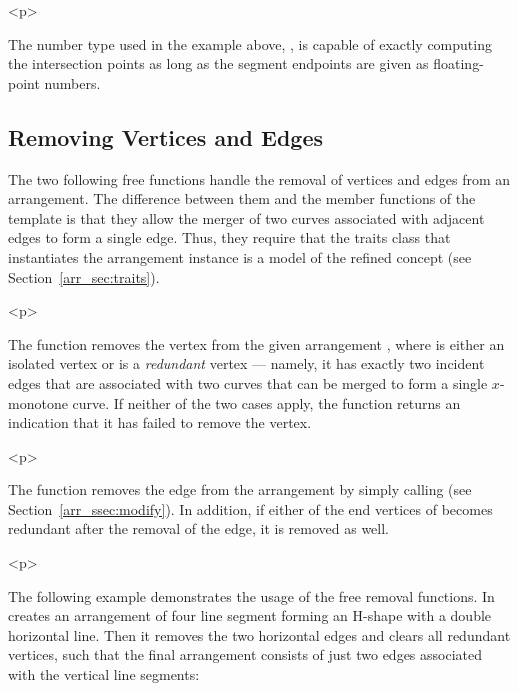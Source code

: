 
\begin{ccHtmlOnly}<p>\end{ccHtmlOnly}
The number type used in the example above,
, is capable of exactly computing the
intersection points as long as the segment endpoints are given as
floating-point numbers.

\subsection{Removing Vertices and Edges}
\label{arr_ssec:gl_remove}
%
The two following free functions handle the removal of vertices
and edges from an arrangement. The difference between them and the
member functions of the  template is that they
allow the merger of two curves associated with adjacent edges to
form a single edge. Thus, they require that the traits class that
instantiates the arrangement instance is a model of the refined
 concept (see
Section~\ref{arr_sec:traits}).

\begin{ccHtmlOnly}<p>\end{ccHtmlOnly}
The function  removes the vertex
 from the given arrangement , where  is
either an isolated vertex or is a {\em redundant} vertex ---
namely, it has exactly two incident edges that are associated with
two curves that can be merged to form a single $x$-monotone curve.
If neither of the two cases apply, the function returns an
indication that it has failed to remove the vertex.

\begin{ccHtmlOnly}<p>\end{ccHtmlOnly}
The function  removes the edge 
from the arrangement by simply calling 
(see Section~\ref{arr_ssec:modify}). In addition, if either of the
end vertices of  becomes redundant after the removal of the
edge, it is removed as well.

\begin{ccHtmlOnly}<p>\end{ccHtmlOnly}
The following example demonstrates the usage of the free removal
functions. In creates an arrangement of four line segment forming
an H-shape with a double horizontal line. Then it removes the two
horizontal edges and clears all redundant vertices, such that the
final arrangement consists of just two edges associated with the
vertical line segments:

